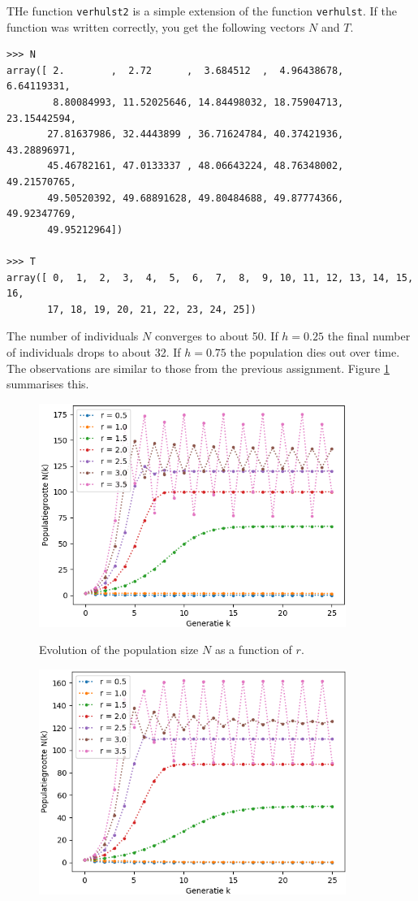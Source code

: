 \begin{Answer}\phantom{}
    \Question THe function \texttt{verhulst2} is a simple extension of the function \texttt{verhulst}.
    \Question If the function was written correctly, you get the following vectors $N$ and $T$.
\begin{lstlisting}
>>> N 
array([ 2.        ,  2.72      ,  3.684512  ,  4.96438678,  6.64119331,
        8.80084993, 11.52025646, 14.84498032, 18.75904713, 23.15442594,
       27.81637986, 32.4443899 , 36.71624784, 40.37421936, 43.28896971,
       45.46782161, 47.0133337 , 48.06643224, 48.76348002, 49.21570765,
       49.50520392, 49.68891628, 49.80484688, 49.87774366, 49.92347769,
       49.95212964])

>>> T
array([ 0,  1,  2,  3,  4,  5,  6,  7,  8,  9, 10, 11, 12, 13, 14, 15, 16,
       17, 18, 19, 20, 21, 22, 23, 24, 25])
\end{lstlisting}
    \Question The number of individuals
    $N$ converges to about 50.
    \Question If $h = 0.25$ the final number of individuals drops to about 32. If $h = 0.75$ the population dies out over time.
    \Question The observations are similar to those from the previous assignment. Figure \ref{fig:verhulstR} summarises this.
\begin{figure}[H]
				\centering
				\includegraphics[width=10cm]{verhulstR.png}\\
				\caption{Evolution of the population size $N$ as a function of $r$.\label{fig:verhulstR}}
			\end{figure}
\begin{figure}[H]
				\centering
				\includegraphics[width=10cm]{verhulstR2.png}\\

\end{figure}
\end{Answer}
